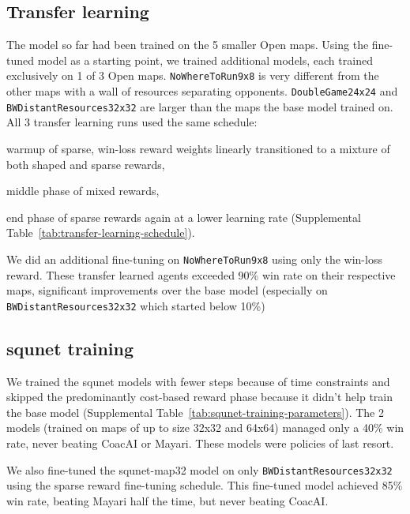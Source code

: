 \documentclass[conference]{IEEEtran}
\begin{document}
\subsection{Transfer learning}
The model so far had been trained on the 5 smaller Open maps. Using the
fine-tuned model as a starting point, we trained additional models, each trained exclusively
on 1 of 3 Open maps. \texttt{NoWhereToRun9x8} is very different from the other maps with a wall of
resources separating opponents. \texttt{DoubleGame24x24} and
\texttt{BWDistantResources32x32} are larger than the maps the base model trained on.
All 3 transfer learning runs used the same schedule:
\begin{inparaenum}[(1)]
    \item warmup of sparse, win-loss reward weights linearly transitioned to a mixture
    of both shaped and sparse rewards,
    \item middle phase of mixed rewards,
    \item end phase of sparse rewards again at a lower learning rate (Supplemental Table~\ref{tab:transfer-learning-schedule}).
\end{inparaenum}
We did an additional fine-tuning on \texttt{NoWhereToRun9x8} using only the win-loss reward.
These transfer learned agents exceeded 90\% win rate on their respective maps,
significant improvements over the base model (especially on
\texttt{BWDistantResources32x32} which started below 10\%)

\subsection{squnet training}
We trained the squnet models with fewer steps because of time constraints and skipped the
predominantly cost-based reward phase because it didn't help train the
base model (Supplemental Table~\ref{tab:squnet-training-parameters}). The 2 models (trained on maps of
up to size 32x32 and 64x64) managed only a 40\% win rate, never beating CoacAI or Mayari. 
These models were policies of last resort.

We also fine-tuned the squnet-map32 model on only \texttt{BWDistantResources32x32}
using the sparse reward fine-tuning schedule. This fine-tuned 
model achieved 85\% win rate, beating Mayari half the time, but never beating CoacAI.
\end{document}
